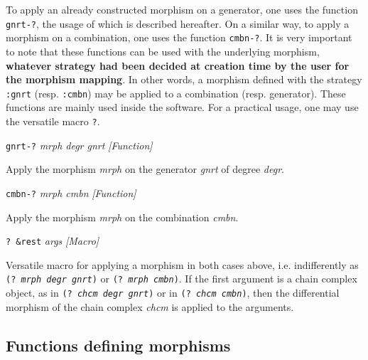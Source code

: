 To apply an already constructed morphism on a generator, 
one uses the function  {\tt gnrt-?}, 
the usage of which is described hereafter. On a similar way, to apply a morphism on a combination,
one uses the function {\tt cmbn-?}.
It is very important to note that these functions
can be used with the underlying morphism, {\bf whatever strategy had been decided
at creation time by the user for the morphism mapping}. In other words, a morphism defined
with the strategy {\tt :gnrt} (resp. {\tt :cmbn}) may be applied to a combination (resp.  generator).
These functions are mainly used inside the software. For a practical usage, one may use the versatile macro
{\tt ?}.
\vskip 0.35cm
{\parindent=0mm
{\leftskip=5mm
{\tt gnrt-?} {\em mrph degr gnrt} \hfill {\em [Function]} \par}
{\leftskip=15mm
Apply the morphism {\em mrph} on the generator  {\em gnrt} of degree {\em degr}. \par}
{\leftskip=5mm
{\tt cmbn-?} {\em mrph cmbn} \hfill {\em [Function]} \par}
{\leftskip=15mm
Apply the morphism {\em mrph} on the combination  {\em cmbn}. \par}
{\leftskip=5mm
{\tt ? \&rest} {\em args} \hfill {\em [Macro]} \par}
{\leftskip=15mm
Versatile macro for applying a morphism  in both cases above, i.e. indifferently
as {\tt (? {\em mrph degr gnrt})} or  {\tt (? {\em mrph cmbn})}. If the first argument
is a chain complex object, as in  {\tt (? {\em chcm degr gnrt})} or in  {\tt (? {\em chcm cmbn})}, then 
the differential morphism of the chain complex {\em chcm} is applied to the arguments. \par}
}

\newpage

\subsection {Functions defining morphisms}

